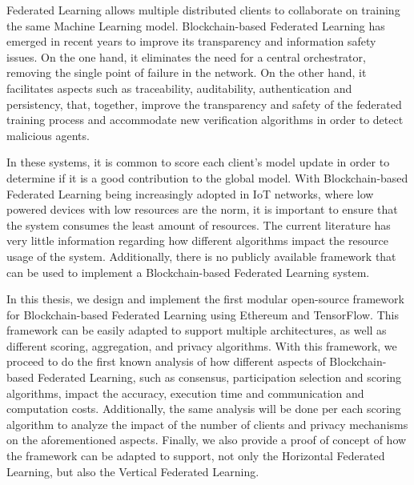 Federated Learning allows multiple distributed clients to collaborate on training the same Machine Learning model. Blockchain-based Federated Learning has emerged in recent years to improve its transparency and information safety issues. On the one hand, it eliminates the need for a central orchestrator, removing the single point of failure in the network. On the other hand, it facilitates aspects such as traceability, auditability, authentication and persistency, that, together, improve the transparency and safety of the federated training process and accommodate new verification algorithms in order to detect malicious agents.

In these systems, it is common to score each client's model update in order to determine if it is a good contribution to the global model. With Blockchain-based Federated Learning being increasingly adopted in IoT networks, where low powered devices with low resources are the norm, it is important to ensure that the system consumes the least amount of resources. The current literature has very little information regarding how different algorithms impact the resource usage of the system. Additionally, there is no publicly available framework that can be used to implement a Blockchain-based Federated Learning system.

In this thesis, we design and implement the first modular open-source framework for Blockchain-based Federated Learning using Ethereum and TensorFlow. This framework can be easily adapted to support multiple architectures, as well as different scoring, aggregation, and privacy algorithms. With this framework, we proceed to do the first known analysis of how different aspects of Blockchain-based Federated Learning, such as consensus, participation selection and scoring algorithms, impact the accuracy, execution time and communication and computation costs. Additionally, the same analysis will be done per each scoring algorithm to analyze the impact of the number of clients and privacy mechanisms on the aforementioned aspects. Finally, we also provide a proof of concept of how the framework can be adapted to support, not only the Horizontal Federated Learning, but also the Vertical Federated Learning.